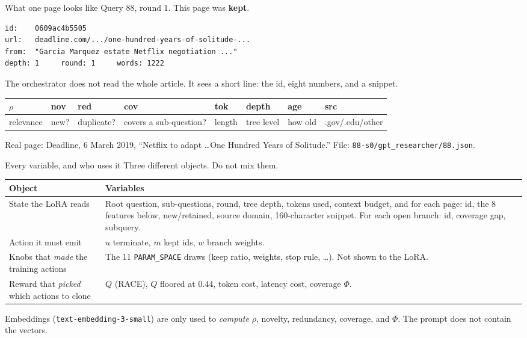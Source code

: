 \documentclass[aspectratio=169,11pt]{beamer}
\begin{document}
\begin{frame}[fragile]{What one page looks like}
  Query 88, round 1. This page was \textbf{kept}.
  \vspace{0.25em}
  \begin{verbatim}
id:    0609ac4b5505
url:   deadline.com/.../one-hundred-years-of-solitude-...
from:  "Garcia Marquez estate Netflix negotiation ..."
depth: 1     round: 1     words: 1222
  \end{verbatim}
  \vspace{0.2em}
  The orchestrator does not read the whole article. It sees a short line: the id, eight numbers, and a snippet.
  \vspace{0.25em}
  \begin{tabular}{llllllll}
    \hline
    $\rho$ & nov & red & cov & tok & depth & age & src \\
    \hline
    relevance & new? & duplicate? & covers a sub-question? & length & tree level & how old & .gov/.edu/other \\
    \hline
  \end{tabular}
  \vspace{0.3em}
  {\small Real page: Deadline, 6 March 2019, ``Netflix to adapt \ldots One Hundred Years of Solitude.'' File: \texttt{88-s0/gpt\_researcher/88.json}.}
\end{frame}

\begin{frame}{Every variable, and who uses it}
  \small
  Three different objects. Do not mix them.
  \vspace{0.25em}
  \begin{tabular}{lp{8.6cm}}
    \hline
    Object & Variables \\
    \hline
    State the LoRA reads & Root question, sub-questions, round, tree depth, tokens used, context budget, and for each page: id, the 8 features below, new/retained, source domain, 160-character snippet. For each open branch: id, coverage gap, subquery. \\
    Action it must emit & $u$ terminate, $m$ kept ids, $w$ branch weights. \\
    Knobs that \emph{made} the training actions & The 11 \texttt{PARAM\_SPACE} draws (keep ratio, weights, stop rule, \ldots). Not shown to the LoRA. \\
    Reward that \emph{picked} which actions to clone & $Q$ (RACE), $Q$ floored at 0.44, token cost, latency cost, coverage $\Phi$. \\
    \hline
  \end{tabular}
  \vspace{0.35em}
  Embeddings (\texttt{text-embedding-3-small}) are only used to \emph{compute} $\rho$, novelty, redundancy, coverage, and $\Phi$. The prompt does not contain the vectors.
\end{frame}
\end{document}
